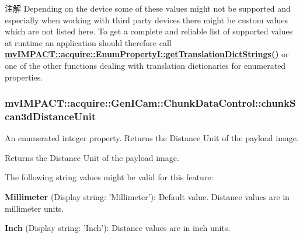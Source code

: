 \begin{DoxyNote}{注解}
Depending on the device some of these values might not be supported and especially when working with third party devices there might be custom values which are not listed here. To get a complete and reliable list of supported values at runtime an application should therefore call {\bfseries \hyperlink{classmv_i_m_p_a_c_t_1_1acquire_1_1_enum_property_i_a0ba6ccbf5ee69784d5d0b537924d26b6}{mv\+I\+M\+P\+A\+C\+T\+::acquire\+::\+Enum\+Property\+I\+::get\+Translation\+Dict\+Strings()}} or one of the other functions dealing with translation dictionaries for enumerated properties. 
\end{DoxyNote}
\hypertarget{classmv_i_m_p_a_c_t_1_1acquire_1_1_gen_i_cam_1_1_chunk_data_control_a4fb027191f957cc9e3884ba176e52562}{
\subsubsection[{chunk\+Scan3d\+Distance\+Unit}]{ mv\+I\+M\+P\+A\+C\+T\+::acquire\+::\+Gen\+I\+Cam\+::\+Chunk\+Data\+Control\+::chunk\+Scan3d\+Distance\+Unit}}\label{classmv_i_m_p_a_c_t_1_1acquire_1_1_gen_i_cam_1_1_chunk_data_control_a4fb027191f957cc9e3884ba176e52562}


An enumerated integer property. Returns the Distance Unit of the payload image. 

Returns the Distance Unit of the payload image.

The following string values might be valid for this feature\+:
\begin{DoxyItemize}
\item {\bfseries Millimeter} (Display string\+: 'Millimeter')\+: Default value. Distance values are in millimeter units.
\item {\bfseries Inch} (Display string\+: 'Inch')\+: Distance values are in inch units.
\end{DoxyItemize}

